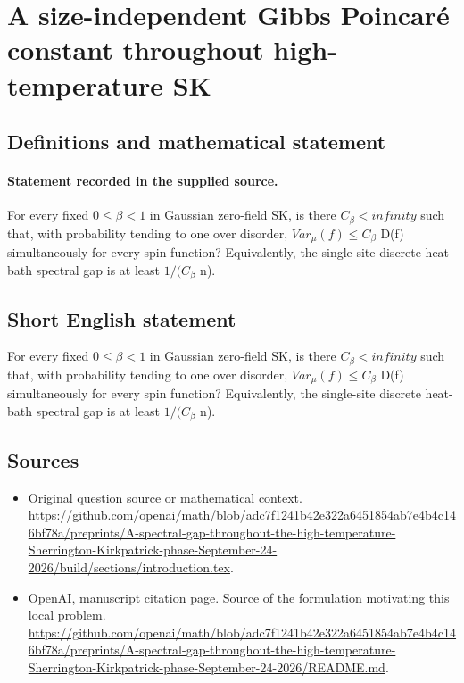 \documentclass[11pt]{article}
\begin{document}
\section*{A size-independent Gibbs Poincaré constant throughout high-temperature SK}\label{30007391}
\subsection{Definitions and mathematical statement}
\paragraph{Statement recorded in the supplied source.}
For every fixed $0\leq \beta <1$ in Gaussian zero-field SK, is there $C_\beta <infinity$ such that, with probability tending to one over disorder, $Var_\mu (f)\leq C_\beta $ D(f) simultaneously for every spin function? Equivalently, the single-site discrete heat-bath spectral gap is at least $1/(C_\beta $ n).
\subsection{Short English statement}
For every fixed $0\leq \beta <1$ in Gaussian zero-field SK, is there $C_\beta <infinity$ such that, with probability tending to one over disorder, $Var_\mu (f)\leq C_\beta $ D(f) simultaneously for every spin function? Equivalently, the single-site discrete heat-bath spectral gap is at least $1/(C_\beta $ n).
\subsection{Sources}
\begin{itemize}
\item[S1] Original question source or mathematical context.
\url{https://github.com/openai/math/blob/adc7f1241b42e322a6451854ab7e4b4c146bf78a/preprints/A-spectral-gap-throughout-the-high-temperature-Sherrington-Kirkpatrick-phase-September-24-2026/build/sections/introduction.tex}.
\item[S2] OpenAI, manuscript citation page. Source of the formulation motivating this local problem.
\url{https://github.com/openai/math/blob/adc7f1241b42e322a6451854ab7e4b4c146bf78a/preprints/A-spectral-gap-throughout-the-high-temperature-Sherrington-Kirkpatrick-phase-September-24-2026/README.md}.
\end{itemize}
\end{document}
